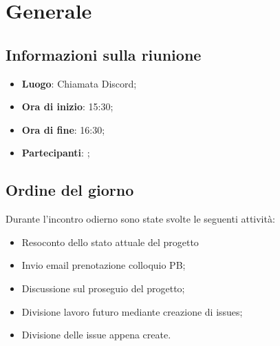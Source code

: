 \section{Generale}

\vspace{10pt}


\subsection{Informazioni sulla riunione}
\begin{itemize}
	\item \textbf{Luogo}: Chiamata Discord;
	\item \textbf{Ora di inizio}: 15:30;
	\item \textbf{Ora di fine}: 16:30;
	\item \textbf{Partecipanti}: \team;
\end{itemize}

\vspace{5pt}

\subsection{Ordine del giorno}

Durante l'incontro odierno sono state svolte le seguenti attività:
\begin{itemize}
	\item Resoconto dello stato attuale del progetto
	\item Invio email prenotazione colloquio PB; 
	\item Discussione sul proseguio del progetto;
	\item Divisione lavoro futuro mediante creazione di issues;
	\item Divisione delle issue appena create.
\end{itemize}
